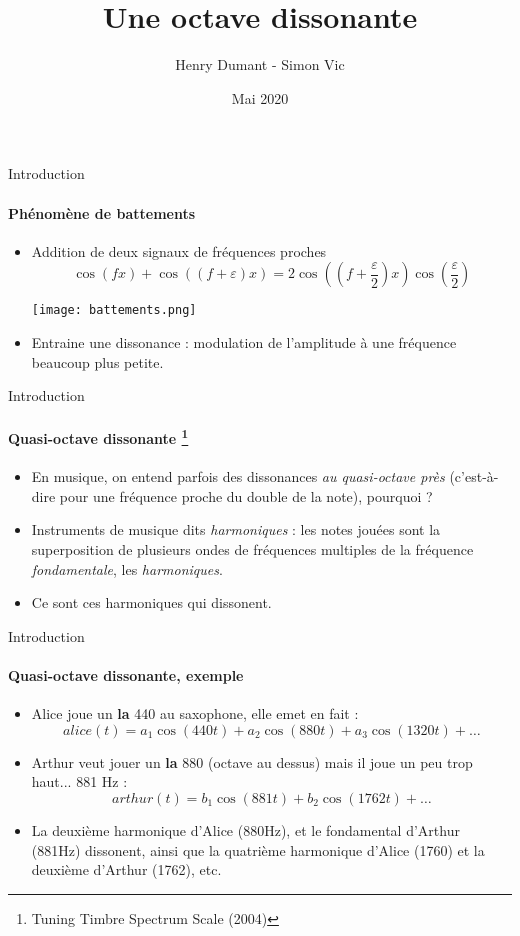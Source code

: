 \documentclass{beamer}
\title{Une octave dissonante}
\author{Henry Dumant - Simon Vic}
\date{Mai 2020}
\begin{document}
\maketitle


\begin{frame}{Introduction}
\framesubtitle{Phénomène de battements}

\begin{itemize}
    \item Addition de deux signaux de fréquences proches
    $$ \cos(f x) + \cos((f + \varepsilon)x) = 2 \cos((f + \frac{\varepsilon}{2})x) \cos(\frac{\varepsilon}{2}) $$
    \begin{center}
        \texttt{[image: battements.png]}
    \end{center}
    \item Entraine une dissonance : modulation de l'amplitude à une fréquence beaucoup plus petite.
    
\end{itemize}
\end{frame}

\begin{frame}{Introduction}
\framesubtitle{Quasi-octave dissonante \footnote{Tuning Timbre Spectrum Scale (2004)}}
\begin{itemize}
    \item En musique, on entend parfois des dissonances \emph{au quasi-octave près} (c'est-à-dire pour une fréquence proche du double de la note), pourquoi ?

    \item Instruments de musique dits \emph{harmoniques} : les notes jouées sont la superposition de plusieurs ondes de fréquences multiples de la fréquence \emph{fondamentale}, les \emph{harmoniques}.
    \item Ce sont ces harmoniques qui dissonent.
\end{itemize}
\end{frame}

\begin{frame}{Introduction}
\framesubtitle{Quasi-octave dissonante, exemple}
\begin{itemize}
\item
    Alice joue un \textbf{la} 440 au saxophone, elle emet en fait : 
    $$ alice(t) = a_1 \cos(440t) + a_2 \cos(880t) + a_3 \cos(1320t) + \dots $$
    \item Arthur veut jouer un \textbf{la} 880 (octave au dessus) mais il joue un peu trop haut... 881 Hz :
    $$ arthur(t) = b_1 \cos(881t) + b_2 \cos(1762t) + \dots $$
    \item La deuxième harmonique d'Alice (880Hz), et le fondamental d'Arthur (881Hz) dissonent, ainsi que la quatrième harmonique d'Alice (1760) et la deuxième d'Arthur (1762), etc.
    
\end{itemize}
\end{frame}
\end{document}
